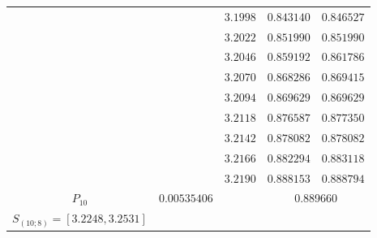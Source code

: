 \documentclass[10pt]{amsart}
\numberwithin{equation}{section}
\theoremstyle{definition}
\newcommand\intpx[2]{S_{(#1;#2)}}
\begin{document}
\begin{longtable}{|c|c|c|c|c|}
  &  &  $3.1998 $  &  $ 0.843140 $ & $ 0.846527 $ \\
  &  &  $3.2022 $  &  $ 0.851990 $ & $ 0.851990 $ \\
  &  &  $3.2046 $  &  $ 0.859192 $ & $ 0.861786 $ \\
  &  &  $3.2070 $  &  $ 0.868286 $ & $ 0.869415 $ \\
  &  &  $3.2094 $  &  $ 0.869629 $ & $ 0.869629 $ \\
  &  &  $3.2118 $  &  $ 0.876587 $ & $ 0.877350 $ \\
  &  &  $3.2142 $  &  $ 0.878082 $ & $ 0.878082 $ \\
  &  &  $3.2166 $  &  $ 0.882294 $ & $ 0.883118 $ \\
  &  &  $3.2190 $  &  $ 0.888153 $ & $ 0.888794 $ \\ 
  \hline
         $P_{10}$ & $0.00535406$ & & \multicolumn{2}{c|}{0.889660}  \\
   \hline
 \multirow{12}{*}{  $ \intpx{10}{8} =  [3.2248,3.2531]     $  }  

\end{longtable}
\end{document}
